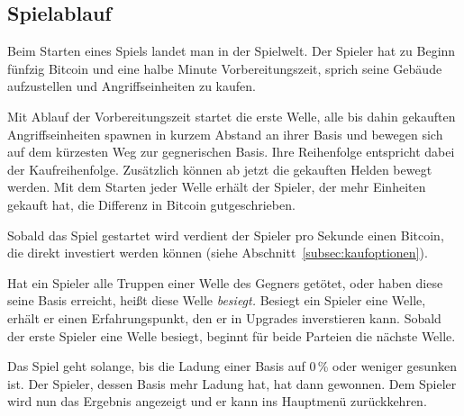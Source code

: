 \subsection{Spielablauf}

Beim Starten eines Spiels landet man in der Spielwelt. Der Spieler hat zu
Beginn fünfzig Bitcoin und eine halbe Minute Vorbereitungszeit, sprich seine
Gebäude aufzustellen und Angriffseinheiten zu kaufen.

Mit Ablauf der Vorbereitungszeit startet die erste Welle, alle bis dahin
gekauften Angriffseinheiten spawnen in kurzem Abstand an ihrer Basis und
bewegen sich auf dem kürzesten Weg zur gegnerischen Basis. Ihre Reihenfolge
entspricht dabei der Kaufreihenfolge. Zusätzlich können ab jetzt die gekauften
Helden bewegt werden.
Mit dem Starten jeder Welle erhält der Spieler, der mehr Einheiten gekauft hat,
die Differenz in Bitcoin gutgeschrieben.

Sobald das Spiel gestartet wird verdient der Spieler pro Sekunde einen Bitcoin,
die direkt investiert werden können (siehe
Abschnitt~\ref{subsec:kaufoptionen}).

Hat ein Spieler alle Truppen einer Welle des Gegners getötet, oder haben diese
seine Basis erreicht, heißt diese Welle \emph{besiegt.} Besiegt ein Spieler
eine Welle, erhält er einen Erfahrungspunkt, den er in Upgrades inverstieren
kann. Sobald der erste Spieler eine Welle besiegt, beginnt für beide Parteien
die nächste Welle.

Das Spiel geht solange, bis die Ladung einer Basis auf 0\,\% oder weniger
gesunken ist. Der Spieler, dessen Basis mehr Ladung hat, hat dann gewonnen. Dem
Spieler wird nun das Ergebnis angezeigt und er kann ins Hauptmenü zurückkehren.
